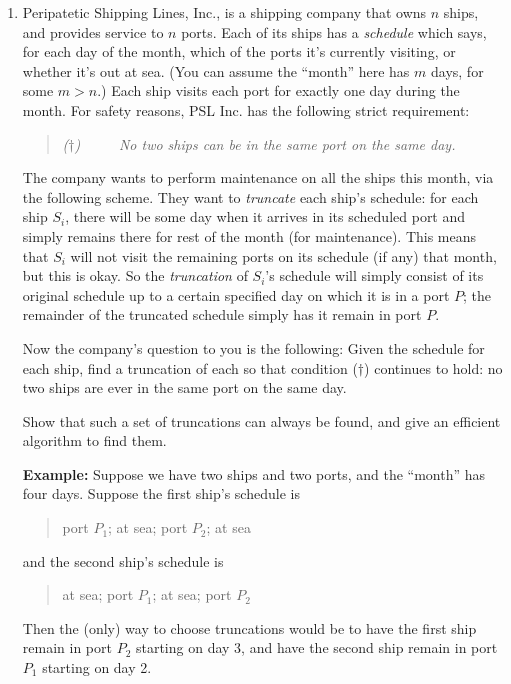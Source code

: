 \documentclass[12pt]{article}
\begin{document}
\begin{enumerate}
{}


\item 

Peripatetic Shipping Lines, Inc., is a shipping
company that owns $n$ ships, and provides service to $n$ ports.
Each of its ships has a {\em schedule}
which says, for each day of the month,
which of the ports it's currently visiting, or whether it's out at sea.
(You can assume the ``month'' here has $m$ days, for some $m > n$.)
Each ship visits each port for exactly one day during the month.
For safety reasons, PSL Inc. has the following strict requirement:
\begin{quote}
{\em ($\dagger$) ~~~~ No two ships can be in the same port on the same day.}
\end{quote}

The company wants to perform maintenance on all the ships this
month, via the following scheme.
They want to {\em truncate} each ship's schedule:
for each ship $S_i$, there will be some day when it arrives
in its scheduled port and simply remains there for rest of
the month (for maintenance).
This means that $S_i$ will not visit the remaining ports
on its schedule (if any) that month, but this is okay.
So the {\em truncation} of $S_i$'s schedule will simply
consist of its original schedule up to a certain specified
day on which it is in a port $P$; the remainder of the
truncated schedule simply has it remain in port $P$.

Now the company's question to you is the following:
Given the schedule for each ship, find a truncation
of each so that condition ($\dagger$) continues to hold:
no two ships are ever in the same port on the same day.

Show that such a set of truncations can always be found,
and give an efficient algorithm to find them.

{\bf Example:} Suppose we have two ships and two ports,
and the ``month'' has four days.
Suppose the first ship's schedule is
\begin{quote}
port $P_1$; at sea; port $P_2$; at sea
\end{quote}
and the second ship's schedule is
\begin{quote}
at sea; port $P_1$; at sea; port $P_2$
\end{quote}
Then the (only) way to choose truncations would be
to have the first ship remain in port $P_2$ starting on day 3,
and have the second ship remain in port $P_1$ starting on day 2.


\end{enumerate}
\end{document}

